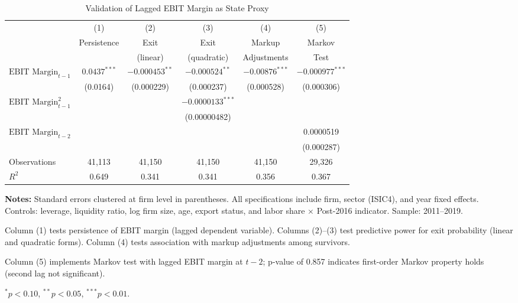 \documentclass[12pt]{article}
\begin{document}
\begin{table}[H]
    \centering
    \caption{Validation of Lagged EBIT Margin as State Proxy}
    \label{tab:ebit_validation}
    \begin{threeparttable}
    \begin{tabular}{l*{5}{c}}
    \toprule
    & \multicolumn{1}{c}{(1)} & \multicolumn{1}{c}{(2)} & \multicolumn{1}{c}{(3)} & \multicolumn{1}{c}{(4)} & \multicolumn{1}{c}{(5)} \\
    & \multicolumn{1}{c}{Persistence} & \multicolumn{1}{c}{Exit} & \multicolumn{1}{c}{Exit} & \multicolumn{1}{c}{Markup} & \multicolumn{1}{c}{Markov} \\
    & \multicolumn{1}{c}{} & \multicolumn{1}{c}{(linear)} & \multicolumn{1}{c}{(quadratic)} & \multicolumn{1}{c}{Adjustments} & \multicolumn{1}{c}{Test} \\
    \midrule
    $\text{EBIT Margin}_{t-1}$ & $0.0437^{***}$ & $-0.000453^{**}$ & $-0.000524^{**}$ & $-0.00876^{***}$ & $-0.000977^{***}$ \\
    & (0.0164) & (0.000229) & (0.000237) & (0.000528) & (0.000306) \\
    \addlinespace
    $\text{EBIT Margin}_{t-1}^2$ & & & $-0.0000133^{***}$ & & \\
    & & & (0.00000482) & & \\
    \addlinespace
    $\text{EBIT Margin}_{t-2}$ & & & & & 0.0000519 \\
    & & & & & (0.000287) \\
    \midrule
    Observations & 41,113 & 41,150 & 41,150 & 41,150 & 29,326 \\
    $R^2$ & 0.649 & 0.341 & 0.341 & 0.356 & 0.367 \\
    \bottomrule
    \end{tabular}
    \begin{tablenotes}
    \small
    \item \textbf{Notes:} Standard errors clustered at firm level in parentheses. All specifications include firm, sector (ISIC4), and year fixed effects. Controls: leverage, liquidity ratio, log firm size, age, export status, and labor share $\times$ Post-2016 indicator. Sample: 2011--2019.
    \item Column (1) tests persistence of EBIT margin (lagged dependent variable). Columns (2)--(3) test predictive power for exit probability (linear and quadratic forms). Column (4) tests association with markup adjustments among survivors.
    \item Column (5) implements Markov test with lagged EBIT margin at $t-2$; p-value of 0.857 indicates first-order Markov property holds (second lag not significant).
    \item $^{*}p<0.10$, $^{**}p<0.05$, $^{***}p<0.01$.
    \end{tablenotes}
    \end{threeparttable}
\end{table}
\end{document}
